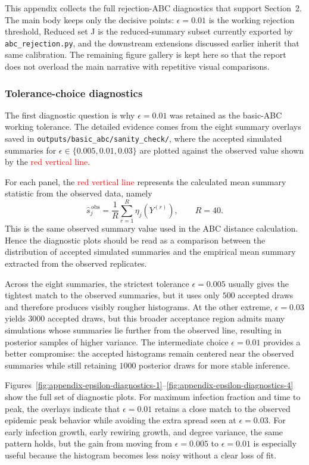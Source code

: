 \documentclass[11pt]{article}
\begin{document}
This appendix collects the full rejection-ABC diagnostics that support Section~2. The main body keeps only the decisive points: $\epsilon=0.01$ is the working rejection threshold, Reduced set J is the reduced-summary subset currently exported by \texttt{abc\_rejection.py}, and the downstream extensions discussed earlier inherit that same calibration. The remaining figure gallery is kept here so that the report does not overload the main narrative with repetitive visual comparisons.

\subsubsection{Tolerance-choice diagnostics}

The first diagnostic question is why $\epsilon = 0.01$ was retained as the basic-ABC working tolerance. The detailed evidence comes from the eight summary overlays saved in \texttt{outputs/basic\_abc/sanity\_check/}, where the accepted simulated summaries for $\epsilon \in \{0.005,0.01,0.03\}$ are plotted against the observed value shown by the \textcolor{red}{red vertical line}.

For each panel, the \textcolor{red}{red vertical line} represents the calculated mean summary statistic from the observed data, namely
\[
\widehat{s}^{\,\mathrm{obs}}_j = \frac{1}{R}\sum_{r=1}^{R}\eta_j\!\left(Y^{(r)}\right),
\qquad R = 40.
\]
This is the same observed summary value used in the ABC distance calculation. Hence the diagnostic plots should be read as a comparison between the distribution of accepted simulated summaries and the empirical mean summary extracted from the observed replicates.

Across the eight summaries, the strictest tolerance $\epsilon = 0.005$ usually gives the tightest match to the observed summaries, but it uses only $500$ accepted draws and therefore produces visibly rougher histograms. At the other extreme, $\epsilon = 0.03$ yields $3000$ accepted draws, but this broader acceptance region admits many simulations whose summaries lie further from the observed line, resulting in posterior samples of higher variance. The intermediate choice $\epsilon = 0.01$ provides a better compromise: the accepted histograms remain centered near the observed summaries while still retaining $1000$ posterior draws for more stable inference.

Figures~\ref{fig:appendix-epsilon-diagnostics-1}--\ref{fig:appendix-epsilon-diagnostics-4} show the full set of diagnostic plots. For maximum infection fraction and time to peak, the overlays indicate that $\epsilon = 0.01$ retains a close match to the observed epidemic peak behavior while avoiding the extra spread seen at $\epsilon = 0.03$. For early infection growth, early rewiring growth, and degree variance, the same pattern holds, but the gain from moving from $\epsilon = 0.005$ to $\epsilon = 0.01$ is especially useful because the histogram becomes less noisy without a clear loss of fit.
\end{document}
